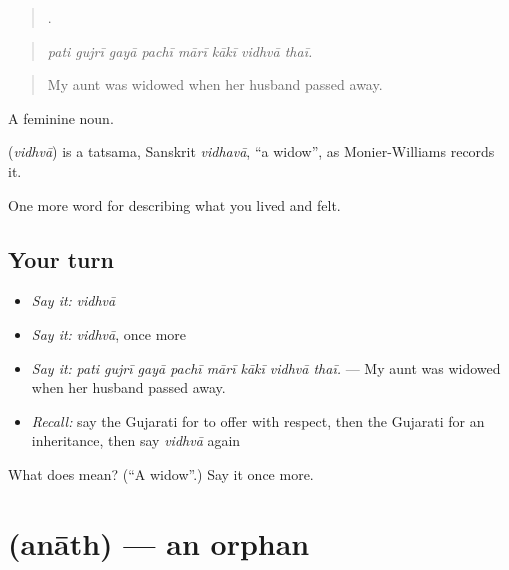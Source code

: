 \begin{quote}
       .
\end{quote}

\begin{quote}
\emph{pati gujrī gayā pachī mārī kākī vidhvā thaī.}
\end{quote}

\begin{quote}
My aunt was widowed when her husband passed away.
\end{quote}

A feminine noun.

\begin{cousinweb}
\textbf{} (\emph{vidhvā}) is a tatsama, Sanskrit \emph{vidhavā}, \textquotedblleft{}a widow\textquotedblright{}, as Monier-Williams records it.
\end{cousinweb}

\begin{grammarlens}[title={What you've built}]
One more word for describing what you lived and felt.
\end{grammarlens}

\subsection*{Your turn}
\begin{itemize}
\raggedright
  \item \emph{Say it:} \emph{vidhvā}
  \item \emph{Say it:} \emph{vidhvā}, once more
  \item \emph{Say it:} \emph{pati gujrī gayā pachī mārī kākī vidhvā thaī.} — My aunt was widowed when her husband passed away.
  \item \emph{Recall:} say the Gujarati for to offer with respect, then the Gujarati for an inheritance, then say \emph{vidhvā} again
\end{itemize}

\begin{tcolorbox}[breakable,colback=teal!4,colframe=teal!35!black,title={Before you move on}]
What does  mean? (\textquotedblleft{}A widow\textquotedblright{}.) Say it once more.
\end{tcolorbox}
\section[\texorpdfstring{\gu{અનાથ} (anāth)}{અનાથ (anāth)}]{ (anāth) — an orphan}

